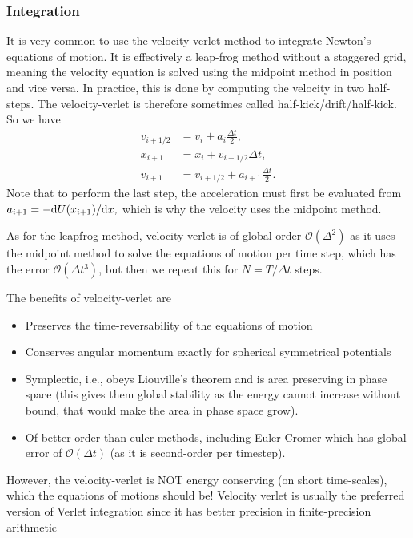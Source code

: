 \documentclass[a4paper, 11pt, notitlepage, english]{article}
\renewcommand{\d}{{\rm d}}
\begin{document}
\subsubsection*{Integration}

It is very common to use the velocity-verlet method to integrate Newton's equations of motion. It is effectively a leap-frog method without a staggered grid, meaning the velocity equation is solved using the midpoint method in position and vice versa. In practice, this is done by computing the velocity in two half-steps. The velocity-verlet is therefore sometimes called half-kick/drift/half-kick. So we have
\begin{align*}
v_{i + 1/2} &= v_i + a_i \frac{\Delta t}{2}, \\
x_{i+1} &= x_i + v_{i+1/2}\Delta t, \\
v_{i + 1} &= v_{i + 1/2} + a_{i+1} \frac{\Delta t}{2}.
\end{align*}
Note that to perform the last step, the acceleration must first be evaluated from $a_{i+1} = -\d U(x_{i+1}) / \d x,$ which is why the velocity uses the midpoint method.

As for the leapfrog method, velocity-verlet is of global order $\mathcal{O}(\Delta^2)$ as it uses the midpoint method to solve the equations of motion per time step, which has the error $\mathcal{O}(\Delta t^3)$, but then we repeat this for $N=T/\Delta t$ steps.

The benefits of velocity-verlet are
\begin{itemize}
	\item Preserves the time-reversability of the equations of motion
	\item Conserves angular momentum exactly for spherical symmetrical potentials
	\item Symplectic, i.e., obeys Liouville's theorem and is area preserving in phase space (this gives them global stability as the energy cannot increase without bound, that would make the area in phase space grow).
	\item Of better order than euler methods, including Euler-Cromer which has global error of $\mathcal{O}(\Delta t)$ (as it is second-order per timestep).
\end{itemize}

However, the velocity-verlet is NOT energy conserving (on short time-scales), which the equations of motions should be! Velocity verlet is usually the preferred version of Verlet integration since it has better precision in finite-precision arithmetic
\end{document}
